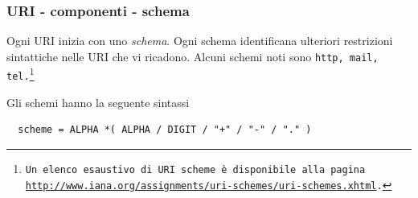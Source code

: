 \documentclass[8pt]{beamer}
\begin{document}
\begin{frame}[fragile]
	\frametitle{URI - componenti - schema}
    Ogni URI inizia con uno \emph{schema}. Ogni schema identificana
    ulteriori restrizioni sintattiche nelle URI che vi ricadono.
    Alcuni schemi noti sono \tt{http}, \tt{mail}, \tt{tel}.\footnote{Un elenco
    esaustivo di URI scheme \`e disponibile alla pagina
    \url{http://www.iana.org/assignments/uri-schemes/uri-schemes.xhtml}.}
    \vspace{\baselineskip}
    
    Gli schemi hanno la seguente sintassi
    \begin{verbatim}
  scheme = ALPHA *( ALPHA / DIGIT / "+" / "-" / "." )
    \end{verbatim}    
\end{frame}




\end{document}

